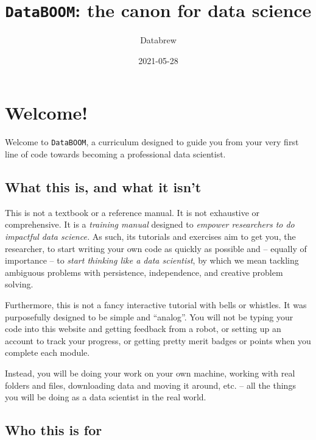 \documentclass[
]{book}
\title{\texttt{DataBOOM}: the canon for data science}
\author{Databrew}
\date{2021-05-28}
\begin{document}
\maketitle

{
\setcounter{tocdepth}{1}
\tableofcontents
}
\hypertarget{welcome}{%
\chapter{Welcome!}\label{welcome}}

Welcome to \texttt{DataBOOM}, a curriculum designed to guide you from your very first line of code towards becoming a professional data scientist.

\hypertarget{what-this-is-and-what-it-isnt}{%
\section*{What this is, and what it isn't}\label{what-this-is-and-what-it-isnt}}

This is not a textbook or a reference manual. It is not exhaustive or comprehensive. It is a \emph{training manual} designed to \emph{empower researchers to do impactful data science.} As such, its tutorials and exercises aim to get you, the researcher, to start writing your own code as quickly as possible and -- equally of importance -- to \emph{start thinking like a data scientist}, by which we mean tackling ambiguous problems with persistence, independence, and creative problem solving.

Furthermore, this is not a fancy interactive tutorial with bells or whistles. It was purposefully designed to be simple and ``analog''. You will not be typing your code into this website and getting feedback from a robot, or setting up an account to track your progress, or getting pretty merit badges or points when you complete each module.

Instead, you will be doing your work on your own machine, working with real folders and files, downloading data and moving it around, etc. -- all the things you will be doing as a data scientist in the real world.

\hypertarget{who-this-is-for}{%
\section*{Who this is for}\label{who-this-is-for}}
\end{document}

